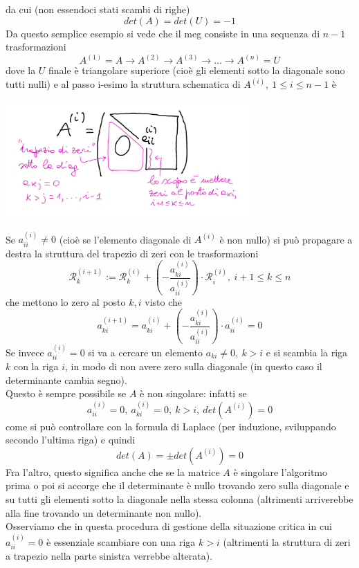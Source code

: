 \documentclass[12pt,a4paper]{article}
\begin{document}
da cui (non essendoci stati scambi di righe)
\begin{equation*}
    det(A) = det(U) = -1
\end{equation*}
Da questo semplice esempio si vede che il meg consiste in una sequenza di $n-1$ trasformazioni
\[
A^{(1)} = A \rightarrow A^{(2)} \rightarrow A^{(3)} \rightarrow \dotso \rightarrow A^{(n)} = U
\]
dove la $U$ finale è triangolare superiore (cioè gli elementi sotto la diagonale sono tutti nulli) e al passo i-esimo la struttura schematica di $A^{(i)}, \ 1 \le i \le n-1$ è
\begin{center}
    \includegraphics[width = 0.7\textwidth]{pag16.jpg}
\end{center}
Se $a_{ii}^{(i)} \neq 0$ (cioè se l'elemento diagonale di $A^{(i)}$ è non nullo) si può propagare a destra la struttura del trapezio di zeri con le trasformazioni
\[
\mathcal{R}_k^{(i+1)} := \mathcal{R}_k^{(i)} + (-\frac{a_{ki}^{(i)}}{a_{ii}^{(i)}}) \cdot \mathcal{R}_i^{(i)}, \ i+1 \le k \le n
\]
che mettono lo zero al posto $k,i$ visto che
\[
a_{ki}^{(i+1)} = a_{ki}^{(i)} + (-\frac{a_{ki}^{(i)}}{a_{ii}^{(i)}}) \cdot a_{ii}^{(i)} = 0
\]
Se invece $a_{ii}^{(i)} = 0$ si va a cercare un elemento $a_{ki} \neq 0, \ k > i$ e si scambia la riga $k$ con la riga $i$, in modo di non avere zero sulla diagonale (in questo caso il determinante cambia segno).\\
Questo è sempre possibile se $A$ è non singolare: infatti se
\[ a_{ii}^{(i)} = 0, \ a_{ki}^{(i)} = 0,\ k > i, \ det(A^{(i)}) = 0 \]
come si può controllare con la formula di Laplace (per induzione, sviluppando secondo l'ultima riga) e quindi
\[ det(A) = \pm det(A^{(i)}) = 0 \]
Fra l'altro, questo significa anche che se la matrice $A$ è singolare l'algoritmo prima o poi si accorge che il determinante è nullo trovando zero sulla diagonale e su tutti gli elementi sotto la diagonale nella stessa colonna (altrimenti arriverebbe alla fine trovando un determinante non nullo).\\
Osserviamo che in questa procedura di gestione della situazione critica in cui $a_{ii}^{(i)} = 0$ è essenziale scambiare con una riga $k > i$ (altrimenti la struttura di zeri a trapezio nella parte sinistra verrebbe alterata).\\
\end{document}
